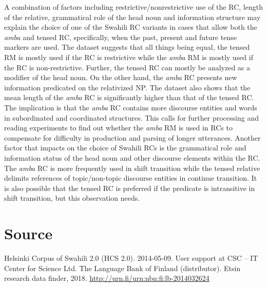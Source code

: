 \documentclass[output=paper,colorlinks,citecolor=brown]{langscibook}
\begin{document}
A combination of factors including restrictive/nonrestrictive use of the RC, length of the relative, grammatical role of the head noun and information structure may explain the choice of one of the Swahili RC variants in cases that allow both the \textit{amba} and tensed RC, specifically, when the past, present and future tense markers are used. The dataset suggests that all things being equal, the tensed RM is mostly used if the RC is restrictive while the \textit{amba} RM is mostly used if the RC is non-restrictive. Further, the tensed RC can mostly be analyzed as a modifier of the head noun. On the other hand, the \textit{amba} RC presents new information predicated on the relativized NP. The dataset also shows that the mean length of the \textit{amba} RC is significantly higher than that of the tensed RC. The implication is that the \textit{amba} RC contains more discourse entities and words in subordinated and coordinated structures. This calls for further processing and reading experiments to find out whether the \textit{amba} RM is used in RCs to compensate for difficulty in production and parsing of longer utterances. Another factor that impacts on the choice of Swahili RCs is the grammatical role and information status of the head noun and other discourse elements within the RC. The \textit{amba} RC is more frequently used in shift transition while the tensed relative delimits references of topic/non-topic discourse entities in continue transition. It is also possible that the tensed RC is preferred if the predicate is intransitive in shift transition, but this observation needs.

\section*{Source}

Helsinki Corpus of Swahili 2.0 (HCS 2.0). 2014-05-09. User support at CSC -- IT Center for Science Ltd. The Language Bank of Finland (distributor). Etsin research data finder, 2018. \url{http://urn.fi/urn:nbn:fi:lb-2014032624}
\end{document}

